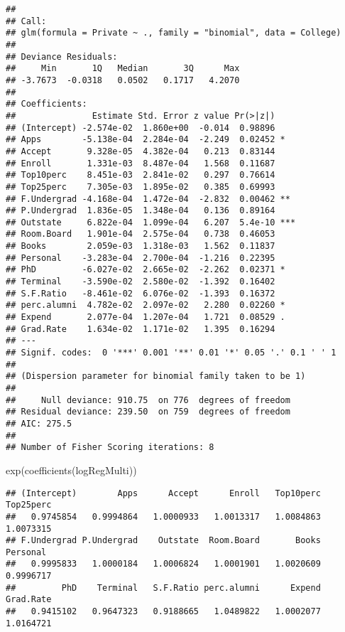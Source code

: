 \documentclass[
]{article}
\newenvironment{Shaded}{\begin{snugshade}}{\end{snugshade}}
\newcommand{\FunctionTok}[1]{\textcolor[rgb]{0.00,0.00,0.00}{#1}}
\newcommand{\NormalTok}[1]{#1}
\begin{document}
\begin{verbatim}
## 
## Call:
## glm(formula = Private ~ ., family = "binomial", data = College)
## 
## Deviance Residuals: 
##     Min       1Q   Median       3Q      Max  
## -3.7673  -0.0318   0.0502   0.1717   4.2070  
## 
## Coefficients:
##               Estimate Std. Error z value Pr(>|z|)    
## (Intercept) -2.574e-02  1.860e+00  -0.014  0.98896    
## Apps        -5.138e-04  2.284e-04  -2.249  0.02452 *  
## Accept       9.328e-05  4.382e-04   0.213  0.83144    
## Enroll       1.331e-03  8.487e-04   1.568  0.11687    
## Top10perc    8.451e-03  2.841e-02   0.297  0.76614    
## Top25perc    7.305e-03  1.895e-02   0.385  0.69993    
## F.Undergrad -4.168e-04  1.472e-04  -2.832  0.00462 ** 
## P.Undergrad  1.836e-05  1.348e-04   0.136  0.89164    
## Outstate     6.822e-04  1.099e-04   6.207  5.4e-10 ***
## Room.Board   1.901e-04  2.575e-04   0.738  0.46053    
## Books        2.059e-03  1.318e-03   1.562  0.11837    
## Personal    -3.283e-04  2.700e-04  -1.216  0.22395    
## PhD         -6.027e-02  2.665e-02  -2.262  0.02371 *  
## Terminal    -3.590e-02  2.580e-02  -1.392  0.16402    
## S.F.Ratio   -8.461e-02  6.076e-02  -1.393  0.16372    
## perc.alumni  4.782e-02  2.097e-02   2.280  0.02260 *  
## Expend       2.077e-04  1.207e-04   1.721  0.08529 .  
## Grad.Rate    1.634e-02  1.171e-02   1.395  0.16294    
## ---
## Signif. codes:  0 '***' 0.001 '**' 0.01 '*' 0.05 '.' 0.1 ' ' 1
## 
## (Dispersion parameter for binomial family taken to be 1)
## 
##     Null deviance: 910.75  on 776  degrees of freedom
## Residual deviance: 239.50  on 759  degrees of freedom
## AIC: 275.5
## 
## Number of Fisher Scoring iterations: 8
\end{verbatim}

\begin{Shaded}
\begin{Highlighting}[]
\FunctionTok{exp}\NormalTok{(}\FunctionTok{coefficients}\NormalTok{(logRegMulti))}
\end{Highlighting}
\end{Shaded}

\begin{verbatim}
## (Intercept)        Apps      Accept      Enroll   Top10perc   Top25perc 
##   0.9745854   0.9994864   1.0000933   1.0013317   1.0084863   1.0073315 
## F.Undergrad P.Undergrad    Outstate  Room.Board       Books    Personal 
##   0.9995833   1.0000184   1.0006824   1.0001901   1.0020609   0.9996717 
##         PhD    Terminal   S.F.Ratio perc.alumni      Expend   Grad.Rate 
##   0.9415102   0.9647323   0.9188665   1.0489822   1.0002077   1.0164721
\end{verbatim}
\end{document}
